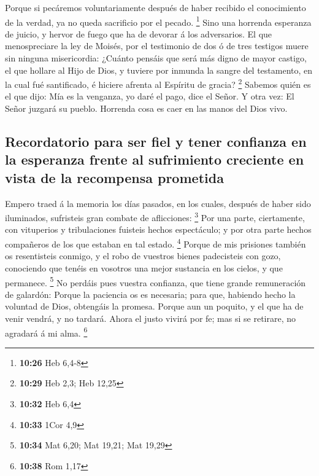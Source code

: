  Porque si pecáremos voluntariamente después de haber
recibido el conocimiento de la verdad, ya no queda sacrificio por el
pecado. \footnote{\textbf{10:26} Heb 6,4-8}  Sino una
horrenda esperanza de juicio, y hervor de fuego que ha de devorar á los
adversarios.  El que menospreciare la ley de Moisés, por
el testimonio de dos ó de tres testigos muere sin ninguna misericordia:
 ¿Cuánto pensáis que será más digno de mayor castigo, el
que hollare al Hijo de Dios, y tuviere por inmunda la sangre del
testamento, en la cual fué santificado, é hiciere afrenta al Espíritu de
gracia? \footnote{\textbf{10:29} Heb 2,3; Heb 12,25} 
Sabemos quién es el que dijo: Mía es la venganza, yo daré el pago, dice
el Señor. Y otra vez: El Señor juzgará su pueblo. 
Horrenda cosa es caer en las manos del Dios vivo.

\hypertarget{recordatorio-para-ser-fiel-y-tener-confianza-en-la-esperanza-frente-al-sufrimiento-creciente-en-vista-de-la-recompensa-prometida}{%
\subsection{Recordatorio para ser fiel y tener confianza en la esperanza
frente al sufrimiento creciente en vista de la recompensa
prometida}\label{recordatorio-para-ser-fiel-y-tener-confianza-en-la-esperanza-frente-al-sufrimiento-creciente-en-vista-de-la-recompensa-prometida}}

 Empero traed á la memoria los días pasados, en los
cuales, después de haber sido iluminados, sufristeis gran combate de
aflicciones: \footnote{\textbf{10:32} Heb 6,4}  Por una
parte, ciertamente, con vituperios y tribulaciones fuisteis hechos
espectáculo; y por otra parte hechos compañeros de los que estaban en
tal estado. \footnote{\textbf{10:33} 1Cor 4,9}  Porque de
mis prisiones también os resentisteis conmigo, y el robo de vuestros
bienes padecisteis con gozo, conociendo que tenéis en vosotros una mejor
sustancia en los cielos, y que permanece. \footnote{\textbf{10:34} Mat
  6,20; Mat 19,21; Mat 19,29}  No perdáis pues vuestra
confianza, que tiene grande remuneración de galardón: 
Porque la paciencia os es necesaria; para que, habiendo hecho la
voluntad de Dios, obtengáis la promesa.  Porque aun un
poquito, y el que ha de venir vendrá, y no tardará. 
Ahora el justo vivirá por fe; mas si se retirare, no agradará á mi alma.
\footnote{\textbf{10:38} Rom 1,17}

